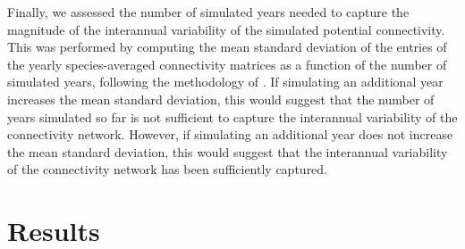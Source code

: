 \documentclass[preprint,12pt,authoryear]{elsarticle}
\begin{document}
Finally, we assessed the number of simulated years needed to capture the magnitude of the interannual variability of the simulated potential connectivity. This was performed by computing the mean standard deviation of the entries of the yearly species-averaged connectivity matrices as a function of the number of simulated years, following the methodology of \cite{thompson2018variability}. If simulating an additional year increases the mean standard deviation, this would suggest that the number of years simulated so far is not sufficient to capture the interannual variability of the connectivity network. However, if simulating an additional year does not increase the mean standard deviation, this would suggest that the interannual variability of the connectivity network has been sufficiently captured.
	
	\section*{Results}
	
\end{document}
